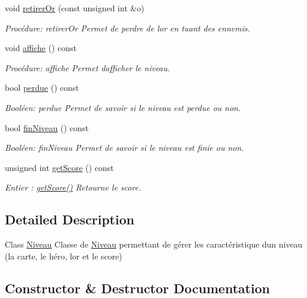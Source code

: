 \begin{DoxyCompactItemize}
void \hyperlink{classNiveau_a11f7ce4e0918a94d41c66459394cdd49}{retirer\+Or} (const unsigned int \&o)
\begin{DoxyCompactList}\small\item\em Procédure\+: retirer\+Or Permet de perdre de l\textquotesingle{}or en tuant des ennemis. \end{DoxyCompactList}\item 
void \hyperlink{classNiveau_ac0aff25fcdea980ff740344f58be0bbc}{affiche} () const
\begin{DoxyCompactList}\small\item\em Procédure\+: affiche Permet d\textquotesingle{}afficher le niveau. \end{DoxyCompactList}\item 
bool \hyperlink{classNiveau_ad1345f4f482fdd18213cab3b4cd8b8dc}{perdue} () const
\begin{DoxyCompactList}\small\item\em Booléen\+: perdue Permet de savoir si le niveau est perdue ou non. \end{DoxyCompactList}\item 
bool \hyperlink{classNiveau_aa94199eb0d75ab0d17c05272667e07a3}{fin\+Niveau} () const
\begin{DoxyCompactList}\small\item\em Booléen\+: fin\+Niveau Permet de savoir si le niveau est finie ou non. \end{DoxyCompactList}\item 
unsigned int \hyperlink{classNiveau_a8428b988346e7a5cf4cb2add69f8b16d}{get\+Score} () const
\begin{DoxyCompactList}\small\item\em Entier \+: \hyperlink{classNiveau_a8428b988346e7a5cf4cb2add69f8b16d}{get\+Score()} Retourne le score. \end{DoxyCompactList}\end{DoxyCompactItemize}


\subsection{Detailed Description}
Class \hyperlink{classNiveau}{Niveau} Classe de \hyperlink{classNiveau}{Niveau} permettant de gérer les caractéristique d\textquotesingle{}un niveau (la carte, le héro, l\textquotesingle{}or et le score) 

\subsection{Constructor \& Destructor Documentation}
\mbox{\label{classNiveau_abf99be59a575d462a25c4ade5c124431}} 
